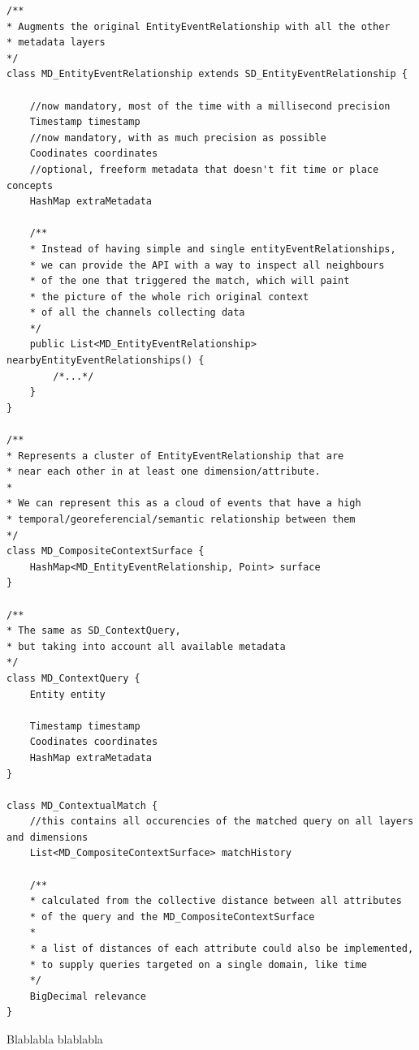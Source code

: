 \begin{verbatim}
/**
* Augments the original EntityEventRelationship with all the other
* metadata layers
*/
class MD_EntityEventRelationship extends SD_EntityEventRelationship {
    
    //now mandatory, most of the time with a millisecond precision
    Timestamp timestamp
    //now mandatory, with as much precision as possible
    Coodinates coordinates
    //optional, freeform metadata that doesn't fit time or place concepts
    HashMap extraMetadata

    /**
    * Instead of having simple and single entityEventRelationships,
    * we can provide the API with a way to inspect all neighbours
    * of the one that triggered the match, which will paint
    * the picture of the whole rich original context
    * of all the channels collecting data
    */
    public List<MD_EntityEventRelationship> nearbyEntityEventRelationships() {
        /*...*/
    }
}

/**
* Represents a cluster of EntityEventRelationship that are
* near each other in at least one dimension/attribute.
*
* We can represent this as a cloud of events that have a high
* temporal/georeferencial/semantic relationship between them
*/
class MD_CompositeContextSurface {
    HashMap<MD_EntityEventRelationship, Point> surface
}

/**
* The same as SD_ContextQuery,
* but taking into account all available metadata
*/
class MD_ContextQuery {
    Entity entity

    Timestamp timestamp
    Coodinates coordinates
    HashMap extraMetadata
}

class MD_ContextualMatch {
    //this contains all occurencies of the matched query on all layers and dimensions
    List<MD_CompositeContextSurface> matchHistory

    /**
    * calculated from the collective distance between all attributes
    * of the query and the MD_CompositeContextSurface
    * 
    * a list of distances of each attribute could also be implemented,
    * to supply queries targeted on a single domain, like time
    */
    BigDecimal relevance
}
\end{verbatim}

Blablabla blablabla

\newpage
